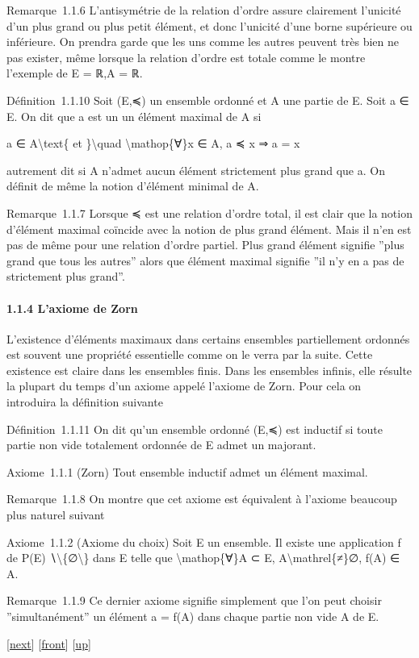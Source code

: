 \documentclass[]{article}
\begin{document}
Remarque~1.1.6 L'antisymétrie de la relation d'ordre assure clairement
l'unicité d'un plus grand ou plus petit élément, et donc l'unicité d'une
borne supérieure ou inférieure. On prendra garde que les uns comme les
autres peuvent très bien ne pas exister, même lorsque la relation
d'ordre est totale comme le montre l'exemple de E = ℝ,A = ℝ.

Définition~1.1.10 Soit (E,≼) un ensemble ordonné et A une partie de E.
Soit a ∈ E. On dit que a est un un élément maximal de A si

a ∈ A\textbackslash{}text\{ et \}\textbackslash{}quad
\textbackslash{}mathop\{∀\}x ∈ A, a ≼ x ⇒ a = x

autrement dit si A n'admet aucun élément strictement plus grand que a.
On définit de même la notion d'élément minimal de A.

Remarque~1.1.7 Lorsque ≼ est une relation d'ordre total, il est clair
que la notion d'élément maximal coïncide avec la notion de plus grand
élément. Mais il n'en est pas de même pour une relation d'ordre partiel.
Plus grand élément signifie ''plus grand que tous les autres'' alors que
élément maximal signifie ''il n'y en a pas de strictement plus grand''.

\paragraph{1.1.4 L'axiome de Zorn}

L'existence d'éléments maximaux dans certains ensembles partiellement
ordonnés est souvent une propriété essentielle comme on le verra par la
suite. Cette existence est claire dans les ensembles finis. Dans les
ensembles infinis, elle résulte la plupart du temps d'un axiome appelé
l'axiome de Zorn. Pour cela on introduira la définition suivante

Définition~1.1.11 On dit qu'un ensemble ordonné (E,≼) est inductif si
toute partie non vide totalement ordonnée de E admet un majorant.

Axiome~1.1.1 (Zorn) Tout ensemble inductif admet un élément maximal.

Remarque~1.1.8 On montre que cet axiome est équivalent à l'axiome
beaucoup plus naturel suivant

Axiome~1.1.2 (Axiome du choix) Soit E un ensemble. Il existe une
application f de P(E) ∖\textbackslash{}\{∅\textbackslash{}\} dans E
telle que \textbackslash{}mathop\{∀\}A ⊂ E,
A\textbackslash{}mathrel\{≠\}∅, f(A) ∈ A.

Remarque~1.1.9 Ce dernier axiome signifie simplement que l'on peut
choisir ''simultanément'' un élément a = f(A) dans chaque partie non
vide A de E.

{[}\href{coursse2.html}{next}{]} {[}\href{coursse1.html}{front}{]}
{[}\href{coursch2.html\#coursse1.html}{up}{]}
\end{document}
